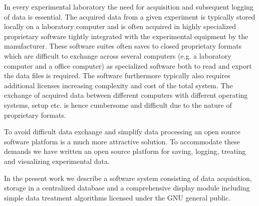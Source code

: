 In every experimental laboratory the need for acquisition and subsequent
logging of data is essential. The acquired data from a given experiment is
typically stored locally on a laboratory computer and is often acquired in
highly specialized proprietary software tightly integrated with the
experimental equipment by the manufacturer. These software suites often saves
to closed proprietary formats which are difficult to exchange across several
computers (e.g. a laboratory computer and a office computer) as specialized
software both to read and export the data files is required. The software
furthermore typically also requires additional licenses increasing complexity
and cost of the total system. The exchange of acquired data between different
computers with different operating systems, setup etc. is hence cumbersome and
difficult due to the nature of proprietary formats.

To avoid difficult data exchange and simplify data processing an open source
software platform is a much more attractive
solution\cite{Benn2009,Murray2011,So2007}. To accommodate these demands we have
written an open source platform for saving, logging, treating and visualizing
experimental data.

In the present work we describe a software system consisting of data
acquisition, storage in a centralized database and a comprehensive display
module including simple data treatment algorithms licensed under the GNU
general public.
